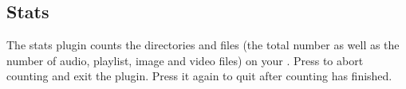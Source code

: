 \subsection{Stats}

The stats plugin counts the directories and files
(the total number as well as the number
of audio, playlist, image and video files)
on your \dap{}.
Press 
to abort counting and
exit the plugin. Press it again to quit after counting has
finished.
